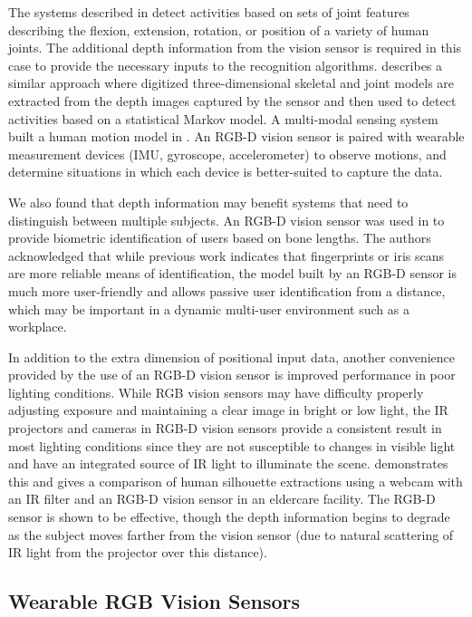\documentclass[12pt]{report}
\begin{document}
The systems described in \cite{Ong2013, Yao2016} detect activities based on sets of joint features describing the flexion, extension, rotation, or position of a variety of human joints. The additional depth information from the vision sensor is required in this case to provide the necessary inputs to the recognition algorithms. \cite{Figueroa-Angulo2013} describes a similar approach where digitized three-dimensional skeletal and joint models are extracted from the depth images captured by the sensor and then used to detect activities based on a statistical Markov model. A multi-modal sensing system built a human motion model in \cite{Akbari2017}. An RGB-D vision sensor is paired with wearable measurement devices (IMU, gyroscope, accelerometer) to observe motions, and determine situations in which each device is better-suited to capture the data.

We also found that depth information may benefit systems that need to distinguish between multiple subjects. An RGB-D vision sensor was used in \cite{Zhao2017} to provide biometric identification of users based on bone lengths. The authors acknowledged that while previous work indicates that fingerprints or iris scans are more reliable means of identification, the model built by an RGB-D sensor is much more user-friendly and allows passive user identification from a distance, which may be important in a dynamic multi-user environment such as a workplace.

In addition to the extra dimension of positional input data, another convenience provided by the use of an RGB-D vision sensor is improved performance in poor lighting conditions. While RGB vision sensors may have difficulty properly adjusting exposure and maintaining a clear image in bright or low light, the IR projectors and cameras in RGB-D vision sensors provide a consistent result in most lighting conditions since they are not susceptible to changes in visible light and have an integrated source of IR light to illuminate the scene. \cite{Banerjee2014} demonstrates this and gives a comparison of human silhouette extractions using a webcam with an IR filter and an RGB-D vision sensor in an eldercare facility. The RGB-D sensor is shown to be effective, though the depth information begins to degrade as the subject moves farther from the vision sensor (due to natural scattering of IR light from the projector over this distance).

\subsection{Wearable RGB Vision Sensors}
\end{document}
